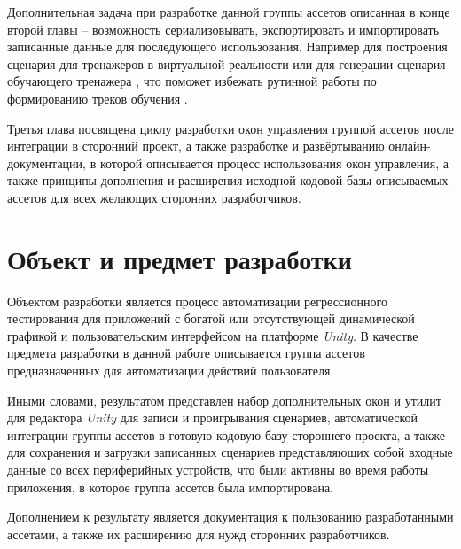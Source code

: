 Дополнительная задача при разработке данной группы ассетов описанная в конце второй главы -- возможность сериализовывать, экспортировать и импортировать записанные данные для последующего использования. Например для построения сценария для тренажеров в виртуальной реальности \cite{disser} или для генерации сценария обучающего тренажера \cite{vr-simulators}, что поможет избежать рутинной работы по формированию треков обучения \cite{visual-editor}.

Третья глава посвящена циклу разработки окон управления группой ассетов после интеграции в сторонний проект, а также разработке и развёртыванию онлайн-документации, в которой описывается процесс использования окон управления, а также принципы дополнения и расширения исходной кодовой базы описываемых ассетов для всех желающих сторонних разработчиков.


\section*{Объект и предмет разработки}
Объектом разработки является процесс автоматизации регрессионного тестирования для приложений с богатой или отсутствующей динамической графикой и пользовательским интерфейсом на платформе \textit{Unity}. В качестве предмета разработки в данной работе описывается группа ассетов предназначенных для автоматизации действий пользователя.

Иными словами, результатом представлен набор дополнительных окон и утилит для редактора \textit{Unity} для записи и проигрывания сценариев, автоматической интеграции группы ассетов в готовую кодовую базу стороннего проекта, а также для сохранения и загрузки записанных сценариев представляющих собой входные данные со всех периферийных устройств, что были активны во время работы приложения, в которое группа ассетов была импортирована.

Дополнением к результату является документация к пользованию разработанными ассетами, а также их расширению для нужд сторонних разработчиков.
